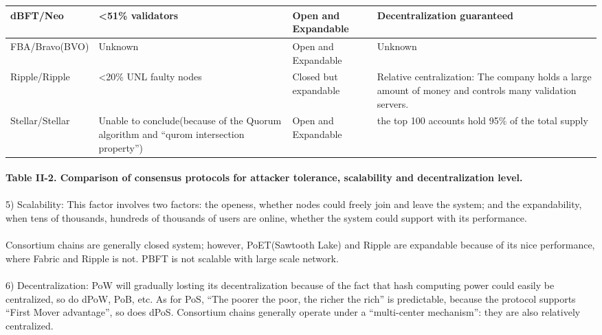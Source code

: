 \documentclass[doublespacing]{bmcart}
\begin{document}
\begin{CJK*}{UTF8}{gbsn}
\begin{tabular}{p{2cm}p{3cm}p{3cm}p{3cm}}
dBFT/Neo 
& \textless51\% validators 
& Open and Expandable 
& Decentralization guaranteed \\ \hline

FBA/Bravo\newline(BVO) 
& Unknown 
& Open and Expandable 
& Unknown  \\ \hline

Ripple/Ripple 
& \textless20\% UNL faulty nodes 
& Closed but expandable
& Relative centralization: The company holds a large amount of money and controls many validation servers.\\ \hline

Stellar/Stellar 
& Unable to conclude(because of the Quorum algorithm and ``qurom intersection property'') 
& Open and Expandable 
& the top 100 accounts hold 95\% of the total supply \\ \hline
\end{tabular}
\paragraph{Table II-2. Comparison of consensus protocols for attacker tolerance, scalability and decentralization level.}

\paragraph{}
5) Scalability: This factor involves two factors: the openess, whether nodes could freely join and leave the system; and the expandability, when tens of thousands, hundreds of thousands of users are online, whether the system could support with its performance.
\paragraph{}
Consortium chains are generally closed system; however, PoET(Sawtooth Lake) and Ripple are expandable because of its nice performance, where Fabric and Ripple is not. PBFT is not scalable with large scale network.
\paragraph{}
6) Decentralization: PoW will gradually losting its decentralization because of the fact that hash computing power could easily be centralized, so do dPoW, PoB, etc. As for PoS, ``The poorer the poor, the richer the rich'' is predictable, because the protocol supports ``First Mover advantage'', so does dPoS. Consortium chains generally operate under a ``multi-center mechanism'': they are also relatively centralized.

\end{CJK*}
\end{document}
